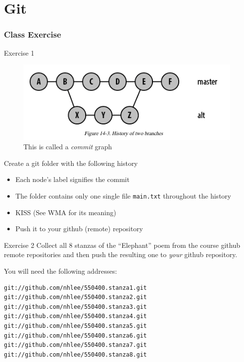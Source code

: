 \documentclass[hyperref={colorlinks=false},handout,10pt]{beamer}
\let\olditem\item
\renewcommand{\item}{\setlength{\itemsep}{0.5\baselineskip}\olditem}
\begin{document}
\section{Git} 
\begin{frame}
    \frametitle{Class Exercise}
    \begin{block}{Exercise 1}
    \begin{figure}
        \caption{\Large This is called a \emph{commit} graph}
        \begin{center}
            \includegraphics[width=\textwidth]{images/gitmergehistory.png}
        \end{center}
    \end{figure}
    \end{block}
    
    \begin{block}{Create a git folder with the following history}
         \begin{itemize}
             \item Each node's label signifies the commit 
             \item The folder contains only one single file \texttt{main.txt}
                 throughout the history
             \item KISS (See WMA for its meaning)
             \item Push it to your github (remote) repository
         \end{itemize}
    \end{block}

    \begin{block}{Exercise 2}
        Collect all 8 stanzas of the ``Elephant'' poem from the course 
        github remote repositories and then push the resulting 
        one to \emph{your} github repository.
    \end{block}
    You will need the following addresses:
    \begin{lstlisting}
git://github.com/nhlee/550400.stanza1.git 
git://github.com/nhlee/550400.stanza2.git 
git://github.com/nhlee/550400.stanza3.git 
git://github.com/nhlee/550400.stanza4.git 
git://github.com/nhlee/550400.stanza5.git 
git://github.com/nhlee/550400.stanza6.git 
git://github.com/nhlee/550400.stanza7.git 
git://github.com/nhlee/550400.stanza8.git 
    \end{lstlisting}
\end{frame}
\end{document}
